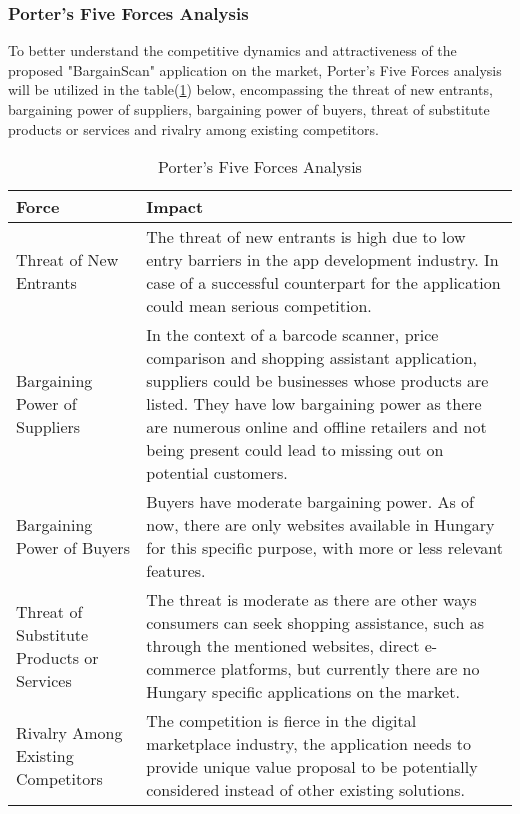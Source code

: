 \pagebreak

\subsubsection{Porter's Five Forces Analysis}

To better understand the competitive dynamics and attractiveness of the proposed "BargainScan" application on the market, Porter's Five Forces analysis will be utilized in the table(\ref{tab:pffa}) below, encompassing the threat of new entrants, bargaining power of suppliers, bargaining power of buyers, threat of substitute products or services and rivalry among existing competitors.

\begin{table}[h]
	\centering
	\begin{tabularx}{\textwidth}{|p{4cm}|X|}
		\hline
		\textbf{Force} & \textbf{Impact} \\
		\hline
		Threat of New Entrants & The threat of new entrants is high due to low entry barriers in the app development industry. In case of a successful counterpart for the application could mean serious competition.\\
		\hline
		Bargaining Power of Suppliers & In the context of a barcode scanner, price comparison and shopping assistant application, suppliers could be businesses whose products are listed. They have low bargaining power as there are numerous online and offline retailers and not being present could lead to missing out on potential customers. \\
		\hline
		Bargaining Power of Buyers & Buyers have moderate bargaining power. As of now, there are only websites available in Hungary for this specific purpose, with more or less relevant features. \\
		\hline
		Threat of Substitute Products or Services & The threat is moderate as there are other ways consumers can seek shopping assistance, such as through the mentioned websites, direct e-commerce platforms, but currently there are no Hungary specific applications on the market. \\
		\hline
		Rivalry Among Existing Competitors & The competition is fierce in the digital marketplace industry, the application needs to provide unique value proposal to be potentially considered instead of other existing solutions. \\
		\hline
	\end{tabularx}
	\caption{Porter's Five Forces Analysis}
	\label{tab:pffa}
\end{table}

